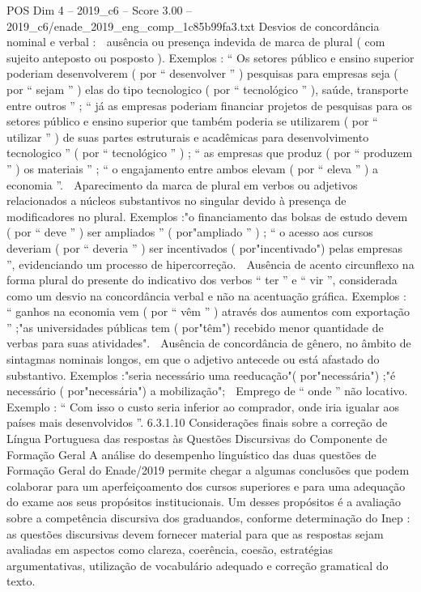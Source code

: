 \begin{textsample}{POS Dim 4 – 2019\_c6 – Score 3.00 – 2019\_c6/enade\_2019\_eng\_comp\_1c85b99fa3.txt}
Desvios de concordância nominal e verbal :  ausência ou presença indevida de marca de plural ( com sujeito anteposto ou posposto ).
Exemplos : “ Os setores público e ensino superior poderiam desenvolverem ( por “ desenvolver ” ) pesquisas para empresas seja ( por “ sejam ” ) elas do tipo tecnologico ( por “ tecnológico ” ), saúde, transporte entre outros ” ; “ já as empresas poderiam financiar projetos de pesquisas para os setores público e ensino superior que também poderia se utilizarem ( por “ utilizar ” ) de suas partes estruturais e acadêmicas para desenvolvimento tecnologico ” ( por “ tecnológico ” ) ; “ as empresas que produz ( por “ produzem ” ) os materiais ” ; “ o engajamento entre ambos elevam ( por “ eleva ” ) a economia ”.  Aparecimento da marca de plural em verbos ou adjetivos relacionados a núcleos substantivos no singular devido à presença de modificadores no plural.
Exemplos :"o financiamento das bolsas de estudo devem ( por “ deve ” ) ser ampliados ” ( por"ampliado ” ) ; “ o acesso aos cursos deveriam ( por “ deveria ” ) ser incentivados ( por"incentivado") pelas empresas ”, evidenciando um processo de hipercorreção.  Ausência de acento circunflexo na forma plural do presente do indicativo dos verbos “ ter ” e “ vir ”, considerada como um desvio na concordância verbal e não na acentuação gráfica.
Exemplos : “ ganhos na economia vem ( por “ vêm ” ) através dos aumentos com exportação ” ;"as universidades públicas tem ( por"têm") recebido menor quantidade de verbas para suas atividades".  Ausência de concordância de gênero, no âmbito de sintagmas nominais longos, em que o adjetivo antecede ou está afastado do substantivo.
Exemplos :"seria necessário uma reeducação"( por"necessária") ;"é necessário ( por"necessária") a mobilização";  Emprego de “ onde ” não locativo.
Exemplo : “ Com isso o custo seria inferior ao comprador, onde iria igualar aos países mais desenvolvidos ”. 6.3.1.10 Considerações finais sobre a correção de Língua Portuguesa das respostas às Questões Discursivas do Componente de Formação Geral A análise do desempenho linguístico das duas questões de Formação Geral do Enade/2019 permite chegar a algumas conclusões que podem colaborar para um aperfeiçoamento dos cursos superiores e para uma adequação do exame aos seus propósitos institucionais.
Um desses propósitos é a avaliação sobre a competência discursiva dos graduandos, conforme determinação do Inep : as questões discursivas devem fornecer material para que as respostas sejam avaliadas em aspectos como clareza, coerência, coesão, estratégias argumentativas, utilização de vocabulário adequado e correção gramatical do texto.

\end{textsample}
